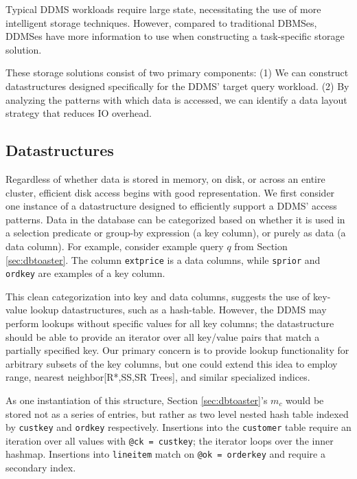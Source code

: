 Typical DDMS workloads require large state, necessitating the use of more intelligent storage techniques.  However, compared to traditional DBMSes, DDMSes have more information to use when constructing a task-specific storage solution.  

These storage solutions consist of two primary components: (1) We can construct datastructures designed specifically for the DDMS' target query workload. (2) By analyzing the patterns with which data is accessed, we can identify a data layout strategy that reduces IO overhead.

\subsection{Datastructures}
Regardless of whether data is stored in memory, on disk, or across an entire cluster, efficient disk access begins with good representation.  We first consider one instance of a datastructure designed to efficiently support a DDMS' access patterns.  Data in the database can be categorized based on whether it is used in a selection predicate or group-by expression (a key column), or purely as data (a data column).  For example, consider example query $q$ from Section \ref{sec:dbtoaster}.  The column \texttt{extprice} is a data columns, while \texttt{sprior} and \texttt{ordkey} are examples of a key column.  

This clean categorization into key and data columns, suggests the use of key-value lookup datastructures, such as a hash-table.  However, the DDMS may perform lookups without specific values for all key columns; the datastructure should be able to provide an iterator over all key/value pairs that match a partially specified key.  Our primary concern is to provide lookup functionality for arbitrary subsets of the key columns, but one could extend this idea to employ range\cite{rangequeries}, nearest neighbor[R*,SS,SR Trees], and similar specialized indices.  


As one instantiation of this structure, Section \ref{sec:dbtoaster}'s $m_c$ would be stored not as a series of entries, but rather as two level nested hash table indexed by \texttt{custkey} and \texttt{ordkey} respectively.  Insertions into the \texttt{customer} table require an iteration over all values with \texttt{@ck = custkey}; the iterator loops over the inner hashmap.  Insertions into \texttt{lineitem} match on \texttt{@ok = orderkey} and require a secondary index.  

